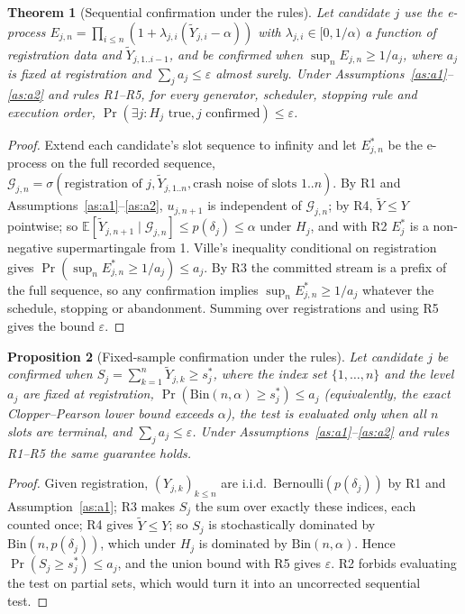 \documentclass[pdflatex,sn-mathphys-num]{sn-jnl}
\theoremstyle{thmstyleone}
\newtheorem{theorem}{Theorem}
\newtheorem{proposition}[theorem]{Proposition}
\theoremstyle{thmstyletwo}
\theoremstyle{thmstylethree}
\newcommand{\E}{\mathbb{E}}
\begin{document}
\begin{theorem}[Sequential confirmation under the rules]\label{thm:seq}
Let candidate $j$ use the e-process $E_{j,n}=\prod_{i\le n}(1+\lambda_{j,i}(\tilde Y_{j,i}-\alpha))$ with $\lambda_{j,i}\in[0,1/\alpha)$ a function of registration data and $\tilde Y_{j,1..i-1}$, and be confirmed when $\sup_nE_{j,n}\ge1/a_j$, where $a_j$ is fixed at registration and $\sum_ja_j\le\varepsilon$ almost surely. Under Assumptions~\ref{as:a1}--\ref{as:a2} and rules R1--R5, for every generator, scheduler, stopping rule and execution order, $\Pr(\exists j:H_j\text{ true}, j\text{ confirmed})\le\varepsilon$.
\end{theorem}
\begin{proof}
Extend each candidate's slot sequence to infinity and let $E^*_{j,n}$ be the e-process on the full recorded sequence, $\mathcal G_{j,n}=\sigma(\text{registration of }j,\tilde Y_{j,1..n},\text{crash noise of slots }1..n)$. By R1 and Assumptions~\ref{as:a1}--\ref{as:a2}, $u_{j,n+1}$ is independent of $\mathcal G_{j,n}$; by R4, $\tilde Y\le Y$ pointwise; so $\E[\tilde Y_{j,n+1}\mid\mathcal G_{j,n}]\le p(\delta_j)\le\alpha$ under $H_j$, and with R2 $E^*_j$ is a non-negative supermartingale from 1. Ville's inequality conditional on registration gives $\Pr(\sup_nE^*_{j,n}\ge1/a_j)\le a_j$. By R3 the committed stream is a prefix of the full sequence, so any confirmation implies $\sup_nE^*_{j,n}\ge1/a_j$ whatever the schedule, stopping or abandonment. Summing over registrations and using R5 gives the bound $\varepsilon$.
\end{proof}

\begin{proposition}[Fixed-sample confirmation under the rules]\label{prop:fixed}
Let candidate $j$ be confirmed when $S_j=\sum_{k=1}^{n}\tilde Y_{j,k}\ge s^*_j$, where the index set $\{1,\dots,n\}$ and the level $a_j$ are fixed at registration, $\Pr(\mathrm{Bin}(n,\alpha)\ge s^*_j)\le a_j$ (equivalently, the exact Clopper--Pearson lower bound exceeds $\alpha$), the test is evaluated only when all $n$ slots are terminal, and $\sum_ja_j\le\varepsilon$. Under Assumptions~\ref{as:a1}--\ref{as:a2} and rules R1--R5 the same guarantee holds.
\end{proposition}
\begin{proof}
Given registration, $(Y_{j,k})_{k\le n}$ are i.i.d.\ Bernoulli$(p(\delta_j))$ by R1 and Assumption~\ref{as:a1}; R3 makes $S_j$ the sum over exactly these indices, each counted once; R4 gives $\tilde Y\le Y$; so $S_j$ is stochastically dominated by $\mathrm{Bin}(n,p(\delta_j))$, which under $H_j$ is dominated by $\mathrm{Bin}(n,\alpha)$. Hence $\Pr(S_j\ge s^*_j)\le a_j$, and the union bound with R5 gives $\varepsilon$. R2 forbids evaluating the test on partial sets, which would turn it into an uncorrected sequential test.
\end{proof}
\end{document}
